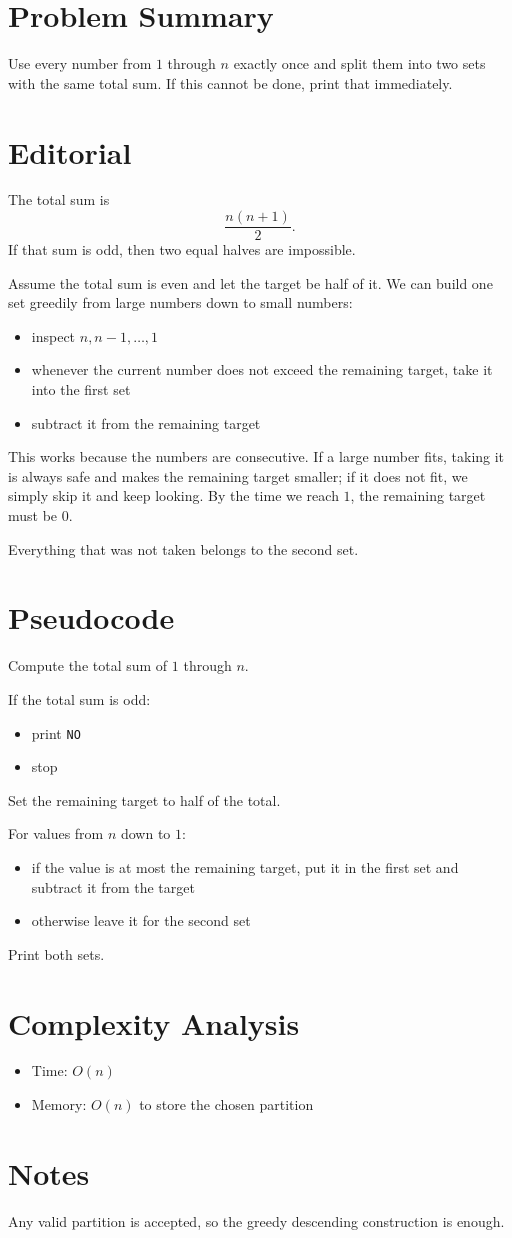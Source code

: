 \section{Problem Summary}
Use every number from \(1\) through \(n\) exactly once and split them into two sets with the same total sum. If this cannot be done, print that immediately.

\section{Editorial}
The total sum is
\[
\frac{n(n + 1)}{2}.
\]
If that sum is odd, then two equal halves are impossible.

Assume the total sum is even and let the target be half of it. We can build one set greedily from large numbers down to small numbers:
\begin{itemize}
\item inspect \(n, n - 1, \ldots, 1\)
\item whenever the current number does not exceed the remaining target, take it into the first set
\item subtract it from the remaining target
\end{itemize}

This works because the numbers are consecutive. If a large number fits, taking it is always safe and makes the remaining target smaller; if it does not fit, we simply skip it and keep looking. By the time we reach \(1\), the remaining target must be \(0\).

Everything that was not taken belongs to the second set.

\section{Pseudocode}
Compute the total sum of \(1\) through \(n\).

If the total sum is odd:
\begin{itemize}
\item print \texttt{NO}
\item stop
\end{itemize}

Set the remaining target to half of the total.

For values from \(n\) down to \(1\):
\begin{itemize}
\item if the value is at most the remaining target, put it in the first set and subtract it from the target
\item otherwise leave it for the second set
\end{itemize}

Print both sets.

\section{Complexity Analysis}
\begin{itemize}
\item Time: \(O(n)\)
\item Memory: \(O(n)\) to store the chosen partition
\end{itemize}

\section{Notes}
Any valid partition is accepted, so the greedy descending construction is enough.
